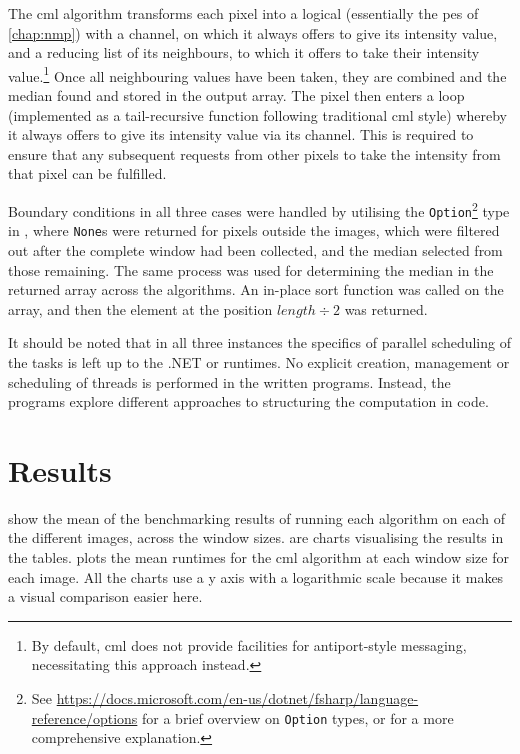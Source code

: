 The \gls{cml} algorithm transforms each pixel into a logical  (essentially the \glspl{pe} of \cref{chap:nmp}) with a channel, on which it always offers to give its intensity value, and a reducing list of its neighbours, to which it offers to take their intensity value.\footnote{By default, \gls{cml} does not provide facilities for antiport-style messaging, necessitating this approach instead.}  Once all neighbouring values have been taken, they are combined and the median found and stored in the output array.  The pixel then enters a loop (implemented as a tail-recursive function following traditional \gls{cml} style) whereby it always offers to give its intensity value via its channel.  This is required to ensure that any subsequent requests from other pixels to take the intensity from that pixel can be fulfilled.

Boundary conditions in all three cases were handled by utilising the \texttt{Option}\footnote{See \url{https://docs.microsoft.com/en-us/dotnet/fsharp/language-reference/options} for a brief overview on \texttt{Option} types, or \eg{} \cite{Syme2015a} for a more comprehensive explanation.} type in \fsharp{}, where \texttt{None}s were returned for pixels outside the images, which were filtered out after the complete window had been collected, and the median selected from those remaining.  The same process was used for determining the median in the returned array across the algorithms.  An in-place sort function was called on the array, and then the element at the position \(\mathit{length} \div 2\) was returned.

It should be noted that in all three instances the specifics of parallel scheduling of the tasks is left up to the .NET or \hopac{} runtimes.  No explicit creation, management or scheduling of threads is performed in the written programs.  Instead, the programs explore different approaches to structuring the computation in code.

\section{Results}

 show the mean of the benchmarking results of running each algorithm on each of the different images, across the window sizes.   are charts visualising the results in the tables.   plots the mean runtimes for the \gls{cml} algorithm at each window size for each image.  All the charts use a y axis with a logarithmic scale because it makes a visual comparison easier here.

